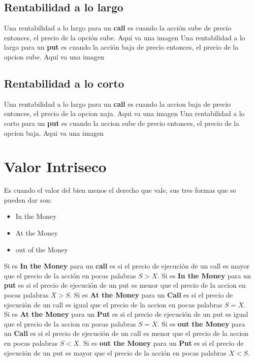 \subsection{Rentabilidad a lo largo}
Una rentabilidad a lo largo para un \textbf{call} es cuando la acción sube de precio entonces, el precio de la opción sube.	
\newline 
Aquí va una imagen
\newline 
Una rentabilidad a lo largo para un \textbf{put} es cuando la acción baja de precio entonces, el precio de la opcion sube.	
\newline 
Aquí va una imagen
\newline 
\subsection{Rentabilidad a lo corto}
Una rentabilidad a lo largo para un \textbf{call} es cuando la accion baja de precio entonces, el precio de la opcion naja.	
\newline 
Aqui va una imagen
\newline 
Una rentabilidad a lo corto para un \textbf{put} es cuando la accion sube de precio entonces, el precio de la opcion baja.	
\newline 
Aqui va una imagen
\section{Valor Intriseco}
Es cuando el valor del bien menos el derecho que vale, sus tres formas que se pueden dar son:
	\begin{itemize}
		\item In the Money
		\item At the Money 
		\item out of the Money
	
	\end{itemize}

Si es \textbf{In the Money} para un \textbf{call} es si el precio de ejecución de un call es mayor que el precio de la acción en pocas palabras $ S > X $.
\newline
Si es \textbf{In the Money} para un \textbf{put} es si el precio de ejecución de un put es menor que el precio de la accion en pocas palabras $ X > S $.
\newline
Si es \textbf{At the Money} para un \textbf{Call} es si el precio de ejecución de un call es igual que el precio de la accion en pocas palabras $ S = X $.
\newline
Si es \textbf{At the Money} para un \textbf{Put} es si el precio de ejecución de un put es igual que el precio de la accion en pocas palabras $ S = X $.
\newline
Si es \textbf{out the Money} para un \textbf{Call} es si el precio de ejecución de un call es menor que el precio de la accion en pocas palabras $ S < X $.
\newline
Si es \textbf{out the Money} para un \textbf{Put} es si el precio de ejecución de un put es mayor que el precio de la acción en pocas palabras $ X < S $.

